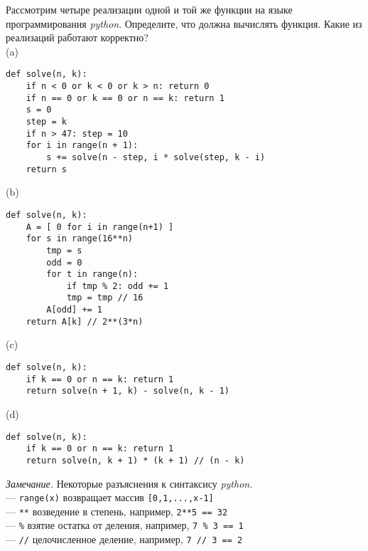 \documentclass{article}
\begin{document}
Рассмотрим четыре реализации одной и той же функции на языке программирования \textit{python}. Определите, что должна вычислять функция. 
Какие из реализаций работают корректно?\\
(a) \begin{lstlisting}
def solve(n, k):
    if n < 0 or k < 0 or k > n: return 0
    if n == 0 or k == 0 or n == k: return 1
    s = 0
    step = k
    if n > 47: step = 10
    for i in range(n + 1):
        s += solve(n - step, i * solve(step, k - i)
    return s
\end{lstlisting}
(b) \begin{lstlisting}
def solve(n, k):
    A = [ 0 for i in range(n+1) ]
    for s in range(16**n)
        tmp = s
        odd = 0
        for t in range(n):
            if tmp % 2: odd += 1
            tmp = tmp // 16
        A[odd] += 1
    return A[k] // 2**(3*n)
\end{lstlisting}
(c) \begin{lstlisting}
def solve(n, k):
    if k == 0 or n == k: return 1
    return solve(n + 1, k) - solve(n, k - 1)
\end{lstlisting}
(d) \begin{lstlisting}
def solve(n, k):
    if k == 0 or n == k: return 1
    return solve(n, k + 1) * (k + 1) // (n - k)
\end{lstlisting}
\textit{Замечание.} Некоторые разъяснения к синтаксису \textit{python}.\\
--- \lstinline!range(x)! возвращает массив \lstinline![0,1,...,x-1]!\\
--- \lstinline!**! возведение в степень, например, \lstinline!2**5 == 32!\\
--- \lstinline!%! взятие остатка от деления, например, \lstinline!7 % 3 == 1!\\
--- \lstinline!//! целочисленное деление, например, \lstinline!7 // 3 == 2!
\end{document}
